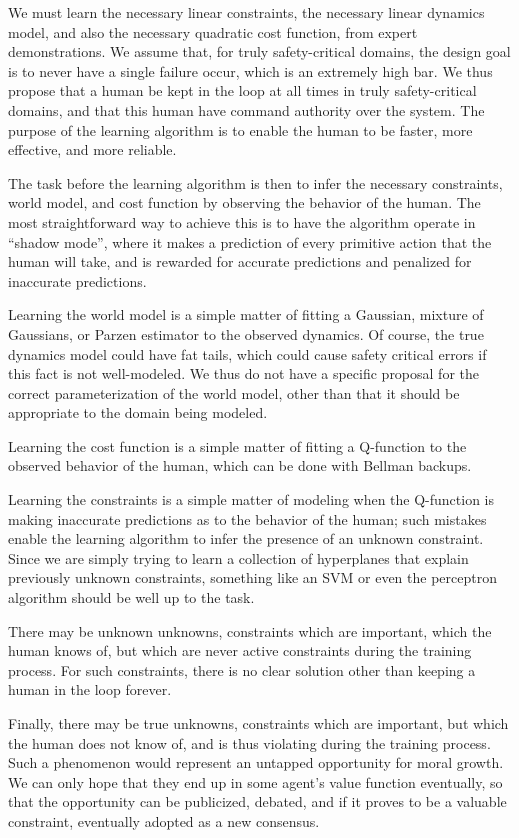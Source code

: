 \documentclass[11pt]{article}
\begin{document}
We must learn the necessary linear constraints, the necessary linear
dynamics model, and also the necessary quadratic cost function, from
expert demonstrations. We assume that, for truly safety-critical
domains, the design goal is to never have a single failure occur,
which is an extremely high bar. We thus propose that a human be kept
in the loop at all times in truly safety-critical domains, and that
this human have command authority over the system. The purpose of the
learning algorithm is to enable the human to be faster, more
effective, and more reliable.

The task before the learning algorithm is then to infer the necessary
constraints, world model, and cost function by observing the behavior
of the human. The most straightforward way to achieve this is to have
the algorithm operate in ``shadow mode'', where it makes a prediction
of every primitive action that the human will take, and is rewarded
for accurate predictions and penalized for inaccurate predictions.

Learning the world model is a simple matter of fitting a Gaussian,
mixture of Gaussians, or Parzen estimator to the observed dynamics.
Of course, the true dynamics model could have fat tails, which could
cause safety critical errors if this fact is not well-modeled. We thus
do not have a specific proposal for the correct parameterization of
the world model, other than that it should be appropriate to the
domain being modeled.

Learning the cost function is a simple matter of fitting a Q-function
to the observed behavior of the human, which can be done with Bellman
backups.

Learning the constraints is a simple matter of modeling when the
Q-function is making inaccurate predictions as to the behavior of the
human; such mistakes enable the learning algorithm to infer the
presence of an unknown constraint. Since we are simply trying to learn
a collection of hyperplanes that explain previously unknown
constraints, something like an SVM or even the perceptron algorithm
should be well up to the task.

There may be unknown unknowns, constraints which are important, which
the human knows of, but which are never active constraints during the
training process. For such constraints, there is no clear solution
other than keeping a human in the loop forever.

Finally, there may be true unknowns, constraints which are important,
but which the human does not know of, and is thus violating during the
training process. Such a phenomenon would represent an untapped
opportunity for moral growth. We can only hope that they end up in
some agent's value function eventually, so that the opportunity can be
publicized, debated, and if it proves to be a valuable constraint,
eventually adopted as a new consensus.
\end{document}
